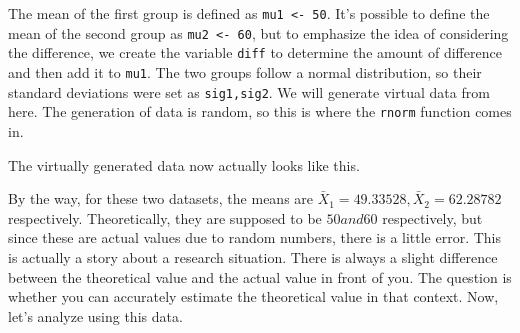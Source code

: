 \documentclass{ltjsbook}
\begin{document}
The mean of the first group is defined as \verb|mu1 <- 50|. It's possible to define the mean of the second group as \verb|mu2 <- 60|, but to emphasize the idea of considering the difference, we create the variable \verb|diff| to determine the amount of difference and then add it to \verb|mu1|.
The two groups follow a normal distribution, so their standard deviations were set as \verb|sig1,sig2|.
We will generate virtual data from here. The generation of data is random, so this is where the \verb|rnorm| function comes in.

The virtually generated data now actually looks like this.

By the way, for these two datasets, the means are $\bar{X}_1=49.33528, \bar{X}_2=62.28782$ respectively. Theoretically, they are supposed to be $50 and $60 respectively, but since these are actual values due to random numbers, there is a little error.
This is actually a story about a research situation. There is always a slight difference between the theoretical value and the actual value in front of you. The question is whether you can accurately estimate the theoretical value in that context.
Now, let's analyze using this data.

\end{document}
